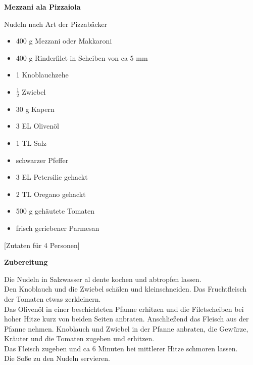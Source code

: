 
\parindent0pt	

\pagestyle{empty}


\textbf{{\LARGE Mezzani ala Pizzaiola}}%


\hrulefill

Nudeln nach Art der Pizzabäcker\\
\vspace*{\fill}
\begin{multicols}{2}	


\begin{itemize}
\item 400 g Mezzani oder Makkaroni
\item 400 g Rinderfilet in Scheiben von ca 5 mm
\item 1 Knoblauchzehe
\item $\frac{1}{2}$ Zwiebel
\item 30 g Kapern
\item 3 EL Olivenöl
\item 1 TL Salz
\item schwarzer Pfeffer
\item 3 EL Petersilie gehackt
\item 2 TL Oregano gehackt
\item 500 g gehäutete Tomaten
\item frisch geriebener Parmesan
\end{itemize}


\end{multicols}
\vspace{1cm}
\begin{center}
[Zutaten für 4 Personen]
\end{center}

\vfill
\newpage
\textbf{{\LARGE Zubereitung}}%

\hrulefill

\vspace*{\fill}
\begin{multicols}{2}


Die Nudeln in Salzwasser al dente kochen und abtropfen lassen.\\

Den Knoblauch und die Zwiebel schälen und kleinschneiden. Das Fruchtfleisch der Tomaten etwas zerkleinern.\\

Das Olivenöl in einer beschichteten Pfanne erhitzen und die Filetscheiben bei hoher Hitze kurz von beiden Seiten anbraten. Anschließend das Fleisch aus der Pfanne nehmen.
Knoblauch und Zwiebel in der Pfanne anbraten, die Gewürze, Kräuter und die Tomaten zugeben und erhitzen.\\

Das Fleisch zugeben und ca 6 Minuten bei mittlerer Hitze schmoren lassen.\\
 
Die Soße zu den Nudeln servieren.




\end{multicols}
\vfill
